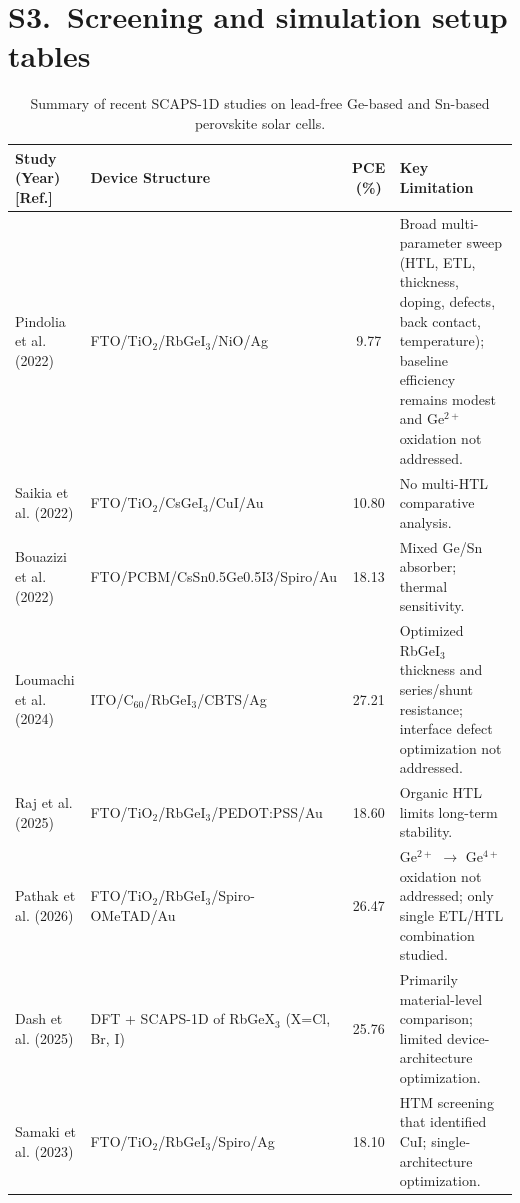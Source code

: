 \documentclass[11pt]{article}
\begin{document}
\section*{S3.\ Screening and simulation setup tables}
\begin{table}[htbp]
\centering
{\small\setlength{\tabcolsep}{3pt}
\begin{tabularx}{\textwidth}{XXcX}
\hline
Study (Year) [Ref.] & Device Structure & PCE (\%) & Key Limitation
\\\hline
Pindolia et al. (2022) \cite{r14} & FTO/\allowbreak{}TiO$_{2}$/RbGeI$_{3}$/NiO/\allowbreak{}Ag & 9.77 & Broad multi-parameter sweep (HTL, ETL, thickness, doping, defects, back contact, temperature); baseline efficiency remains modest and Ge$^{2+}$ oxidation not addressed.\\
Saikia et al. (2022) \cite{r24} & FTO/\allowbreak{}TiO$_{2}$/CsGeI$_{3}$/CuI/\allowbreak{}Au & 10.80 & No multi-HTL comparative analysis.\\
Bouazizi et al. (2022) \cite{r15} & FTO/\allowbreak{}PCBM/\allowbreak{}CsSn0.5Ge0.5I3/\allowbreak{}Spiro/Au & 18.13 & Mixed Ge/Sn absorber; thermal sensitivity.\\
Loumachi et al. (2024) \cite{r22} & ITO/\allowbreak{}C$_{60}$/RbGeI$_{3}$/CBTS/\allowbreak{}Ag & 27.21 & Optimized RbGeI$_{3}$ thickness and series/shunt resistance; interface defect optimization not addressed.\\
Raj et al. (2025) \cite{r39} & FTO/\allowbreak{}TiO$_{2}$/RbGeI$_{3}$/PEDOT:PSS/\allowbreak{}Au & 18.60 & Organic HTL limits long-term stability.\\
Pathak et al. (2026) \cite{r23} & FTO/\allowbreak{}TiO$_{2}$/RbGeI$_{3}$/Spiro-OMeTAD/\allowbreak{}Au & 26.47 & Ge$^{2+}$ $\rightarrow$ Ge$^{4+}$ oxidation not addressed; only single ETL/HTL combination studied.\\
Dash et al. (2025) \cite{r17} & DFT + SCAPS-1D of RbGeX$_{3}$ (X=Cl, Br, I) & 25.76 & Primarily material-level comparison; limited device-architecture optimization.\\
Samaki et al. (2023) \cite{r13} & FTO/\allowbreak{}TiO$_{2}$/RbGeI$_{3}$/Spiro/\allowbreak{}Ag & 18.10 & HTM screening that identified CuI; single-architecture optimization.\\
\hline
\end{tabularx}
}
\caption{Summary of recent SCAPS-1D studies on lead-free Ge-based and Sn-based perovskite solar cells.}
\par{}\par
\end{table}
\end{document}
